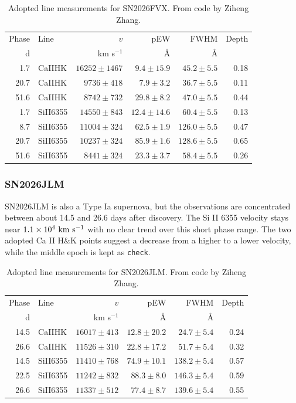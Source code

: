 \documentclass[11pt]{article}
\newcommand{\code}[1]{\texttt{#1}}
\begin{document}
\begin{table}[htbp]
\centering
\caption{Adopted line measurements for SN2026FVX. From code by Ziheng Zhang.}
\label{tab:fvx-lines}
\begin{tabular}{r l r r r r}
\toprule
Phase & Line & $v$ & pEW & FWHM & Depth \\
d & & km s$^{-1}$ & \AA & \AA & \\
\midrule
1.7 & CaIIHK & $16252\pm1467$ & $9.4\pm15.9$ & $45.2\pm5.5$ & 0.18 \\
20.7 & CaIIHK & $9736\pm418$ & $7.9\pm3.2$ & $36.7\pm5.5$ & 0.11 \\
51.6 & CaIIHK & $8742\pm732$ & $29.8\pm8.2$ & $47.0\pm5.5$ & 0.44 \\
1.7 & SiII6355 & $14550\pm843$ & $12.4\pm14.6$ & $60.4\pm5.5$ & 0.13 \\
8.7 & SiII6355 & $11004\pm324$ & $62.5\pm1.9$ & $126.0\pm5.5$ & 0.47 \\
20.7 & SiII6355 & $10237\pm324$ & $85.9\pm1.6$ & $128.6\pm5.5$ & 0.65 \\
51.6 & SiII6355 & $8441\pm324$ & $23.3\pm3.7$ & $58.4\pm5.5$ & 0.26 \\
\bottomrule
\end{tabular}
\end{table}

\subsubsection{SN2026JLM}
SN2026JLM is also a Type Ia supernova, but the observations are concentrated between about 14.5 and 26.6 days after discovery. The Si II 6355 velocity stays near $1.1\times10^4~{\rm km~s^{-1}}$ with no clear trend over this short phase range. The two adopted Ca II H\&K points suggest a decrease from a higher to a lower velocity, while the middle epoch is kept as \code{check}.

\begin{table}[htbp]
\centering
\caption{Adopted line measurements for SN2026JLM. From code by Ziheng Zhang.}
\label{tab:jlm-lines}
\begin{tabular}{r l r r r r}
\toprule
Phase & Line & $v$ & pEW & FWHM & Depth \\
d & & km s$^{-1}$ & \AA & \AA & \\
\midrule
14.5 & CaIIHK & $16017\pm413$ & $12.8\pm20.2$ & $24.7\pm5.4$ & 0.24 \\
26.6 & CaIIHK & $11526\pm310$ & $22.8\pm17.2$ & $51.7\pm5.4$ & 0.32 \\
14.5 & SiII6355 & $11410\pm768$ & $74.9\pm10.1$ & $138.2\pm5.4$ & 0.57 \\
22.5 & SiII6355 & $11242\pm832$ & $88.3\pm8.0$ & $146.3\pm5.4$ & 0.59 \\
26.6 & SiII6355 & $11337\pm512$ & $77.4\pm8.7$ & $139.6\pm5.4$ & 0.55 \\
\bottomrule
\end{tabular}
\end{table}
\end{document}
